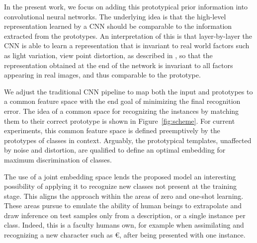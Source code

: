 \documentclass{bmvc2k}
\begin{document}
In the present work, we focus on adding this prototypical prior information into convolutional neural networks. 
The underlying idea is that the high-level representation learned by a CNN should be comparable to the 
information extracted from the prototypes. An interpretation of this is that 
layer-by-layer the CNN is able to learn a representation that is invariant to real world
 factors such as light variation, view point distortion, as described in \cite{goodfellow2009measuring}, so that the representation obtained
  at the end of the network is invariant to all factors appearing in real images, and thus 
  comparable to the prototype.  

We adjust the traditional CNN pipeline to map both the input and prototypes to a
common feature space with the end goal of minimizing the final recognition error. The idea of
a common space for recognizing the instances by matching them to their
correct prototype is shown in Figure~\ref{fig:scheme}. For current
experiments, this common feature space is defined preemptively by the
prototypes of classes in context. Arguably, the prototypical templates, unaffected by noise
and distortion, are qualified to define an optimal embedding for maximum discrimination of classes.

The use of a joint embedding space lends the proposed model an interesting possibility 
of applying it to recognize new classes not present at the training stage. This aligns 
the approach within the areas of zero and one-shot learning. These areas pursue to 
emulate the ability of human beings to extrapolate and draw inference on test samples 
only from a description, or a single instance per class. Indeed, this is a faculty humans 
own, for example when assimilating and recognizing a new character such as \euro, after 
being presented with one instance. 
\end{document}
